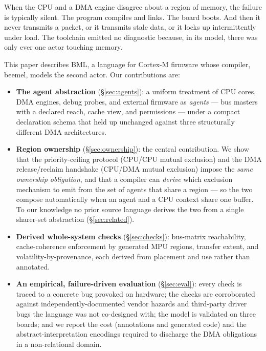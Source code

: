 \documentclass[10pt,twocolumn]{article}
\begin{document}
When the CPU and a DMA engine disagree about a region of memory, the failure is
typically silent. The program compiles and links. The board boots. And then it
never transmits a packet, or it transmits stale data, or it locks up
intermittently under load. The toolchain emitted no diagnostic because, in its
model, there was only ever one actor touching memory.

This paper describes BML, a language for Cortex-M firmware whose compiler,
beemel, models the second actor. Our contributions are:

\begin{itemize}
\item \textbf{The agent abstraction} (\S\ref{sec:agents}): a uniform treatment
of CPU cores, DMA engines, debug probes, and external firmware as
\emph{agents} --- bus masters with a declared reach, cache view, and
permissions --- under a compact declaration schema that held up unchanged
against three structurally different DMA architectures.

\item \textbf{Region ownership} (\S\ref{sec:ownership}): the central
contribution. We show that the priority-ceiling protocol (CPU/CPU mutual
exclusion) and the DMA release/reclaim handshake (CPU/DMA mutual exclusion)
impose the \emph{same ownership obligation}, and that a compiler can
\emph{derive} which exclusion mechanism to emit from the set of agents that share
a region --- so the two compose automatically when an agent and a CPU context
share one buffer. To our knowledge no prior source language derives the two from
a single sharer-set abstraction (\S\ref{sec:related}).

\item \textbf{Derived whole-system checks} (\S\ref{sec:checks}): bus-matrix
reachability, cache-coherence enforcement by generated MPU regions, transfer
extent, and volatility-by-provenance, each derived from placement and use rather
than annotated.

\item \textbf{An empirical, failure-driven evaluation}
(\S\ref{sec:eval}): every check is traced to a concrete bug provoked on hardware;
the checks are corroborated against independently-documented vendor hazards and
third-party driver bugs the language was not co-designed with; the model is
validated on three boards; and we report the cost (annotations and generated
code) and the abstract-interpretation encodings required to discharge the DMA
obligations in a non-relational domain.
\end{itemize}
\end{document}
